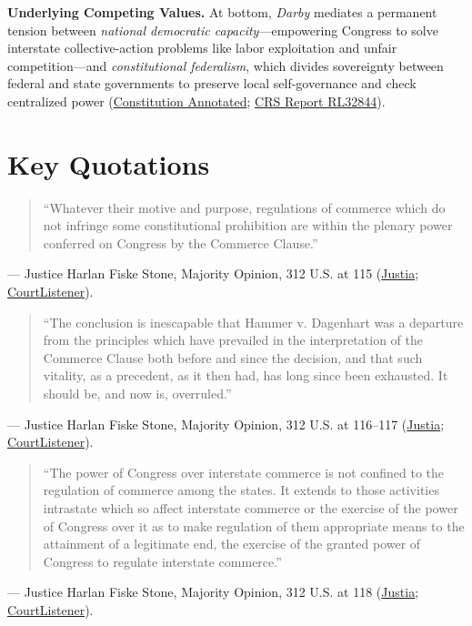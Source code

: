 \documentclass[12pt]{article}
\begin{document}
\textbf{Underlying Competing Values.} At bottom, \textit{Darby} mediates a permanent tension between \textit{national democratic capacity}---empowering Congress to solve interstate collective-action problems like labor exploitation and unfair competition---and \textit{constitutional federalism}, which divides sovereignty between federal and state governments to preserve local self-governance and check centralized power (\href{https://www.law.cornell.edu/constitution-conan/amendment-10/the-tenth-amendment-and-darby}{Constitution Annotated}; \href{https://www.everycrsreport.com/reports/RL32844.html}{CRS Report RL32844}).

\section{Key Quotations}

\begin{quote}
``Whatever their motive and purpose, regulations of commerce which do not infringe some constitutional prohibition are within the plenary power conferred on Congress by the Commerce Clause.''
\end{quote}
\noindent --- Justice Harlan Fiske Stone, Majority Opinion, 312 U.S. at 115 (\href{https://supreme.justia.com/cases/federal/us/312/100/}{Justia}; \href{https://www.courtlistener.com/opinion/103442/united-states-v-darby/}{CourtListener}).

\begin{quote}
``The conclusion is inescapable that Hammer v. Dagenhart was a departure from the principles which have prevailed in the interpretation of the Commerce Clause both before and since the decision, and that such vitality, as a precedent, as it then had, has long since been exhausted. It should be, and now is, overruled.''
\end{quote}
\noindent --- Justice Harlan Fiske Stone, Majority Opinion, 312 U.S. at 116--117 (\href{https://supreme.justia.com/cases/federal/us/312/100/}{Justia}; \href{https://www.courtlistener.com/opinion/103442/united-states-v-darby/}{CourtListener}).

\begin{quote}
``The power of Congress over interstate commerce is not confined to the regulation of commerce among the states. It extends to those activities intrastate which so affect interstate commerce or the exercise of the power of Congress over it as to make regulation of them appropriate means to the attainment of a legitimate end, the exercise of the granted power of Congress to regulate interstate commerce.''
\end{quote}
\noindent --- Justice Harlan Fiske Stone, Majority Opinion, 312 U.S. at 118 (\href{https://supreme.justia.com/cases/federal/us/312/100/}{Justia}; \href{https://www.courtlistener.com/opinion/103442/united-states-v-darby/}{CourtListener}).
\end{document}
